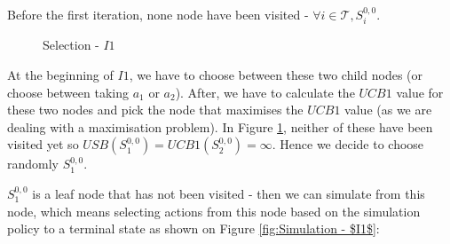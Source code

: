 Before the first iteration, none node have been visited - $\forall i \in \mathcal{T}, S^{0,0}_{i}$.
\begin{figure}[!ht]
    \centering
    \caption{Selection - $I1$}
    \label{fig:Expansion of the tree from the root node}
\end{figure}
At the beginning of $I1$, we have to choose between these two child nodes (or choose between taking $a_1$ or $a_2$). After, we have to calculate the $UCB1$ value for these two nodes and pick the node that maximises the $UCB1$ value (as we are dealing with a maximisation problem).
In Figure \ref{fig:Expansion of the tree from the root node}, neither of these have been visited yet so $USB(S^{0,0}_1)=UCB1(S^{0,0}_2)=\infty$. Hence we decide to choose randomly $S^{0,0}_1$.

$S^{0,0}_1$ is a leaf node that has not been visited - then we can simulate from this node, which means selecting actions from this node based on the simulation policy to a terminal state as shown on Figure \ref{fig:Simulation - $I1$}:

